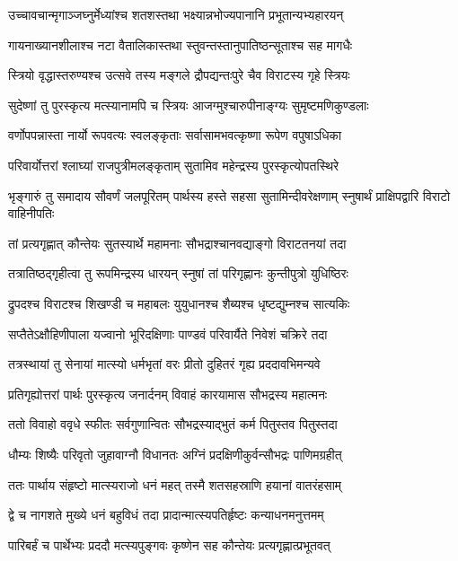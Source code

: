 \twolineshloka
{उच्चावचान्मृगाञ्जघ्नुर्मेध्यांश्च शतशस्तथा}
{भक्ष्यान्नभोज्यपानानि प्रभूतान्यभ्यहारयन्}


\twolineshloka
{गायनाख्यानशीलाश्च नटा वैतालिकास्तथा}
{स्तुवन्तस्तानुपातिष्ठन्सूताश्च सह मागधैः}


\twolineshloka
{स्त्रियो वृद्धास्तरुण्यश्च उत्सवे तस्य मङ्गले}
{द्रौपद्यन्तःपुरे चैव विराटस्य गृहे स्त्रियः}


\twolineshloka
{सुदेष्णां तु पुरस्कृत्य मत्स्यानामपि च स्त्रियः}
{आजग्मुश्चारुपीनाङ्ग्यः सुमृष्टमणिकुण्डलाः}


\twolineshloka
{वर्णोपपन्नास्ता नार्यो रूपवत्यः स्वलङ्कृताः}
{सर्वासामभवत्कृष्णा रूपेण वपुषाऽधिका}


\twolineshloka
{परिवार्योत्तरां श्लाघ्यां राजपुत्रीमलङ्कृताम्}
{सुतामिव महेन्द्रस्य पुरस्कृत्योपतस्थिरे}


\threelineshloka
{भृङ्गारुं तु समादाय सौवर्णं जलपूरितम्}
{पार्थस्य हस्ते सहसा सुतामिन्दीवरेक्षणाम्}
{स्नुषार्थं प्राक्षिपद्वारि विराटो वाहिनीपतिः}


\twolineshloka
{तां प्रत्यगृह्णात् कौन्तेयः सुतस्यार्थे महामनाः}
{सौभद्राश्चानवद्याङ्गो विराटतनयां तदा}


\twolineshloka
{तत्रातिष्ठद्गृहीत्वा तु रूपमिन्द्रस्य धारयन्}
{स्नुषां तां परिगृह्णानः कुन्तीपुत्रो युधिष्ठिरः}


\twolineshloka
{द्रुपदश्च विराटश्च शिखण्डी च महाबलः}
{युयुधानश्च शैब्यश्च धृष्टद्युम्नश्च सात्यकिः}


\twolineshloka
{सप्तैतेऽक्षौहिणीपाला यज्वानो भूरिदक्षिणाः}
{पाण्डवं परिवार्यैते निवेशं चक्रिरे तदा}


\twolineshloka
{तत्रस्थायां तु सेनायां मात्स्यो धर्मभृतां वरः}
{प्रीतो दुहितरं गृह्य प्रददावभिमन्यवे}


\twolineshloka
{प्रतिगृह्योत्तरां पार्थः पुरस्कृत्य जनार्दनम्}
{विवाहं कारयामास सौभद्रस्य महात्मनः}


\twolineshloka
{ततो विवाहो ववृधे स्फीतः सर्वगुणान्वितः}
{सौभद्रस्याद्भुतं कर्म पितुस्तव पितुस्तदा}


\twolineshloka
{धौम्यः शिष्यैः परिवृतो जुहावाग्नौ विधानतः}
{अग्निं प्रदक्षिणीकुर्वन्सौभद्रः पाणिमग्रहीत्}


\twolineshloka
{ततः पार्थाय संहृष्टो मात्स्यराजो धनं महत्}
{तस्मै शतसहस्राणि हयानां वातरंहसाम्}


\twolineshloka
{द्वे च नागशते मुख्ये धनं बहुविधं तदा}
{प्रादान्मात्स्यपतिर्हृष्टः कन्याधनमनुत्तमम्}


\twolineshloka
{पारिबर्हं च पार्थेभ्यः प्रददौ मत्स्यपुङ्गवः}
{कृष्णेन सह कौन्तेयः प्रत्यगृह्णात्प्रभूतवत्}


